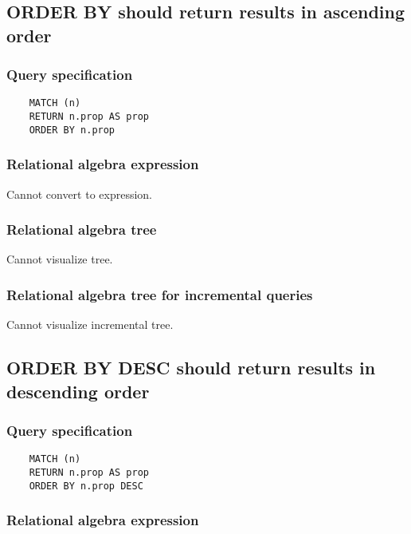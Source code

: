 	\subsection{ORDER BY should return results in ascending order}

	\subsubsection*{Query specification}

	\begin{lstlisting}
	MATCH (n)
	RETURN n.prop AS prop
	ORDER BY n.prop
	\end{lstlisting}


	\subsubsection*{Relational algebra expression}

	Cannot convert to expression.

	\subsubsection*{Relational algebra tree}

	Cannot visualize tree.

	\subsubsection*{Relational algebra tree for incremental queries}

	Cannot visualize incremental tree.
	\subsection{ORDER BY DESC should return results in descending order}

	\subsubsection*{Query specification}

	\begin{lstlisting}
	MATCH (n)
	RETURN n.prop AS prop
	ORDER BY n.prop DESC
	\end{lstlisting}


	\subsubsection*{Relational algebra expression}


